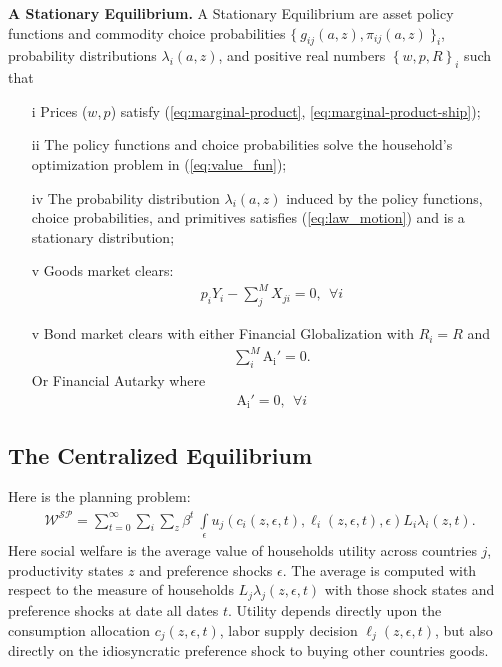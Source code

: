 \documentclass[12pt,pdftex]{article}
\begin{document}
\begin{onehalfspacing}
\textbf{A Stationary Equilibrium.} A Stationary Equilibrium are asset policy functions and commodity choice probabilities $\{\  g_{ij}(a, z), \pi_{ij}(a, z) \ \}_{i}$, probability distributions $\lambda_i(a, z)$, and positive real numbers $\left \{w, p, R\right \}_{i}$ such that
\begin{itemize}
\vspace{-.4cm}
\item[i]  Prices ($w, p$) satisfy (\ref{eq:marginal-product}, \ref{eq:marginal-product-ship});
\item[ii] The policy functions and choice probabilities solve the household's optimization problem in (\ref{eq:value_fun});
\item[iv] The probability distribution $\lambda_i(a, z)$ induced by the policy functions, choice probabilities, and primitives satisfies (\ref{eq:law_motion}) and is a stationary distribution;
\item[v] Goods market clears:
\begin{align}
p_{i} Y_{i} - \sum_{j}^{M}  X_{ji} = 0, \ \ \forall i
\end{align}
\item[v] Bond market clears with either Financial Globalization with $R_i = R$ and
\begin{align}
\sum_{i}^{M} \mathrm{A_i'} = 0.
\label{eq:fg-condition}
\end{align}
Or Financial Autarky where
\begin{align}
\mathrm{A_i'} = 0, \ \ \forall i
\label{eq:fa-condition}
\end{align}
\end{itemize}

\subsection{The Centralized Equilibrium}

Here is the planning problem:
\begin{align}
\mathcal{W^{SP}} =\sum_{t=0}^{\infty}  \sum_{i} \sum\limits_{z} \beta^{t} \ \int\limits_{\epsilon} u_{j}(c_{i}(z, \epsilon, t), \ell_{i}(z, \epsilon, t), \epsilon) L_{i} \lambda_{i}(z, t).
\label{eq:sp-social_welfare}
\end{align}
Here social welfare is the average value of households utility across countries $j$, productivity states $z$ and preference shocks $\epsilon$. The average is computed with respect to the measure of households $L_{j}\lambda_{j}(z, \epsilon, t)$ with those shock states and preference shocks at date all dates $t$. Utility depends directly upon the consumption allocation $c_{j}(z, \epsilon, t)$, labor supply decision $\ell_{j}(z, \epsilon, t)$, but also directly on the idiosyncratic preference shock to buying other countries goods.


\end{onehalfspacing}
\end{document}
